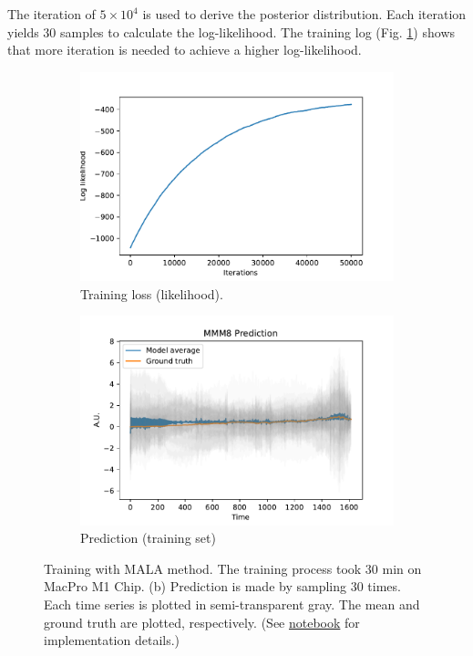 \documentclass{article}
\begin{document}
The iteration of $5\times 10^4$ is used to derive the posterior distribution. Each iteration yields $30$ samples to calculate the log-likelihood. The training log (Fig. \ref{fig:training-log}) shows that more iteration is needed to achieve a higher log-likelihood. 

\begin{figure}[h]
    \centering
    \begin{subfigure}[b]{0.5\textwidth}
        \centering
        \includegraphics[width=\textwidth]{../img/training_MALA_50000-iter.pdf}
        \caption{Training loss (likelihood).}
        \label{fig:training-log}
    \end{subfigure}%
    \begin{subfigure}[b]{0.5\textwidth}
        \centering
        \includegraphics[width=\textwidth]{../img/prediction_MALA_50000-iter.pdf}
        \caption{Prediction (training set)}
        \label{fig:pred-sub}
    \end{subfigure}
    \caption{Training with MALA method. The training process took $30$ min on MacPro M1 Chip. (b) Prediction is made by sampling $30$ times. Each time series is plotted in semi-transparent gray. The mean and ground truth are plotted, respectively. (See \href{https://github.com/stevengogogo/ECEN649_FinalProject/blob/main/script/EXP_fit_time_window.ipynb}{notebook} for implementation details.)}
    \label{fig:pred}
\end{figure}
\end{document}
